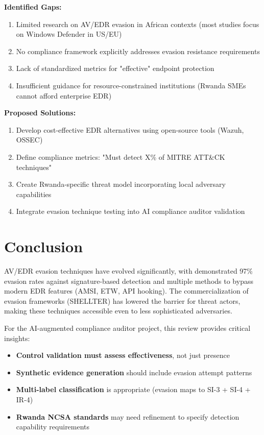 \documentclass[11pt,conference]{IEEEtran}
\begin{document}
\textbf{Identified Gaps:}
\begin{enumerate}
    \item Limited research on AV/EDR evasion in African contexts (most studies focus on Windows Defender in US/EU)
    \item No compliance framework explicitly addresses evasion resistance requirements
    \item Lack of standardized metrics for "effective" endpoint protection
    \item Insufficient guidance for resource-constrained institutions (Rwanda SMEs cannot afford enterprise EDR)
\end{enumerate}

\textbf{Proposed Solutions:}
\begin{enumerate}
    \item Develop cost-effective EDR alternatives using open-source tools (Wazuh, OSSEC)
    \item Define compliance metrics: "Must detect X\% of MITRE ATT\&CK techniques"
    \item Create Rwanda-specific threat model incorporating local adversary capabilities
    \item Integrate evasion technique testing into AI compliance auditor validation
\end{enumerate}

\section{Conclusion}

AV/EDR evasion techniques have evolved significantly, with demonstrated 97\% evasion rates against signature-based detection and multiple methods to bypass modern EDR features (AMSI, ETW, API hooking). The commercialization of evasion frameworks (SHELLTER) has lowered the barrier for threat actors, making these techniques accessible even to less sophisticated adversaries.

For the AI-augmented compliance auditor project, this review provides critical insights:
\begin{itemize}
    \item \textbf{Control validation must assess effectiveness}, not just presence
    \item \textbf{Synthetic evidence generation} should include evasion attempt patterns
    \item \textbf{Multi-label classification} is appropriate (evasion maps to SI-3 + SI-4 + IR-4)
    \item \textbf{Rwanda NCSA standards} may need refinement to specify detection capability requirements
\end{itemize}
\end{document}
